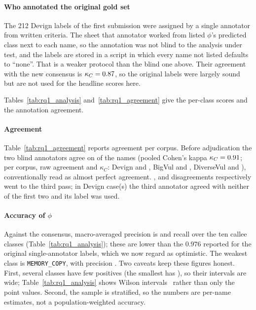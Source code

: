 \paragraph{Who annotated the original gold set} The 212 Devign labels of the
first submission were assigned by a single annotator from written criteria. The sheet
that annotator worked from listed $\phi$'s predicted class next to each name,
so the annotation was not blind to the analysis under test, and the labels are
stored in a script in which every name not listed defaults to ``none''. That
is a weaker protocol than the blind one above.
Their agreement with the new consensus is $\kappa_C=0.87$,
so the original labels were largely sound but are not used for the headline
scores here.

Tables~\ref{tab:rq1_analysis} and~\ref{tab:rq1_agreement} give the per-class
scores and the annotation agreement.



\paragraph{Agreement} Table~\ref{tab:rq1_agreement} reports agreement per corpus.
Before adjudication the two blind annotators agree on \numpooledAgree{} of the
\numpooledNNames{} names (pooled Cohen's kappa $\kappa_C=0.91$; per
corpus, raw agreement and $\kappa_C$: Devign \numdevignAgree{} and
\numdevignKappa, BigVul \numbigvulAgree{} and \numbigvulKappa, DiverseVul
\numdiversevulAgree{} and \numdiversevulKappa), conventionally read as almost
perfect agreement. \numdevignAdjudicated, \numbigvulAdjudicated{} and
\numdiversevulAdjudicated{} disagreements respectively went to the third pass; in
\numdevignUnresolved{} Devign case(s) the third annotator agreed with neither of
the first two and its label was used.

\paragraph{Accuracy of $\phi$} Against the consensus, macro-averaged precision
is \numpooledMacroP{} and recall \numpooledMacroR{} over the ten callee classes
(Table~\ref{tab:rq1_analysis}); these are lower than the $0.976$ reported for
the original single-annotator labels, which we now regard as optimistic. The
weakest class is \texttt{MEMORY\_COPY}, with precision \numcopyPrecision{}. Two
caveats keep these figures honest. First, several classes have few positives
(the smallest has \numminClassPositives), so their intervals are wide;
Table~\ref{tab:rq1_analysis} shows Wilson intervals~\cite{wilson1927probable} rather than only the point
values. Second, the sample is stratified, so the numbers are per-name
estimates, not a population-weighted accuracy.

